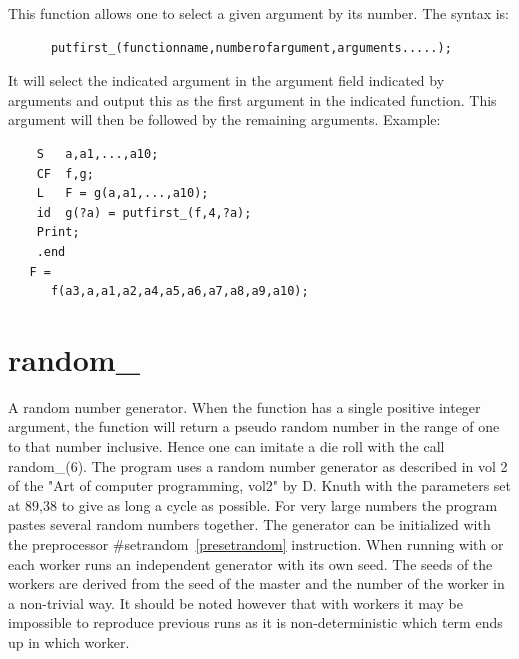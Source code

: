 \noindent 
This function allows one to select a given argument by its number. The 
syntax is:
\begin{verbatim}
      putfirst_(functionname,numberofargument,arguments.....);
\end{verbatim}
It will select the indicated argument in the argument field indicated by 
arguments and output this as the first argument in the indicated function. 
This argument will then be followed by the remaining arguments.
Example:
\begin{verbatim}
    S   a,a1,...,a10;
    CF  f,g;
    L   F = g(a,a1,...,a10);
    id  g(?a) = putfirst_(f,4,?a);
    Print;
    .end
   F =
      f(a3,a,a1,a2,a4,a5,a6,a7,a8,a9,a10);
\end{verbatim}


\section{random\_}
\label{funrandom}
\noindent A random number generator. When the function has a single 
positive integer argument, the function will return a pseudo random number 
in the range of one to that number inclusive. Hence one can imitate a die 
roll with the call random\_(6). The program uses a random number generator 
as described in vol 2 of the "Art of computer programming, vol2" by D. 
Knuth with the parameters set at 89,38 to give as long a cycle as possible. 
For very large numbers the program pastes several random numbers together. 
The generator can be initialized with the preprocessor 
\#setrandom~\ref{presetrandom} instruction. When running 
with \TFORM{} or \ParFORM{} each worker runs an independent generator with its 
own seed. The seeds of the workers are derived from the seed of the master 
and the number of the worker in a non-trivial way. It should be noted 
however that with workers it may be impossible to reproduce previous runs 
as it is non-deterministic which term ends up in which worker.


